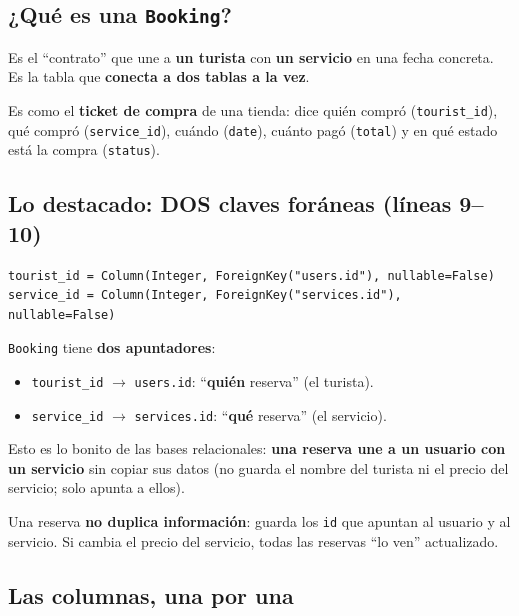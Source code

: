 \documentclass[11pt,a4paper]{article}
\begin{document}
\subsection{¿Qué es una \texttt{Booking}?}

Es el ``contrato'' que une a \textbf{un turista} con \textbf{un servicio} en una fecha concreta.
Es la tabla que \textbf{conecta a dos tablas a la vez}.

\begin{analogia}
Es como el \textbf{ticket de compra} de una tienda: dice quién compró (\texttt{tourist\_id}),
qué compró (\texttt{service\_id}), cuándo (\texttt{date}), cuánto pagó (\texttt{total})
y en qué estado está la compra (\texttt{status}).
\end{analogia}

\subsection{Lo destacado: DOS claves foráneas (líneas 9--10)}

\begin{lstlisting}
tourist_id = Column(Integer, ForeignKey("users.id"), nullable=False)
service_id = Column(Integer, ForeignKey("services.id"), nullable=False)
\end{lstlisting}

\texttt{Booking} tiene \textbf{dos apuntadores}:
\begin{itemize}
    \item \texttt{tourist\_id} $\rightarrow$ \texttt{users.id}: ``\textbf{quién} reserva'' (el turista).
    \item \texttt{service\_id} $\rightarrow$ \texttt{services.id}: ``\textbf{qué} reserva'' (el servicio).
\end{itemize}

Esto es lo bonito de las bases relacionales: \textbf{una reserva une a un usuario con un servicio}
sin copiar sus datos (no guarda el nombre del turista ni el precio del servicio; solo apunta a ellos).

\begin{recuadro}
Una reserva \textbf{no duplica información}: guarda los \texttt{id} que apuntan al usuario y al
servicio. Si cambia el precio del servicio, todas las reservas ``lo ven'' actualizado.
\end{recuadro}

\subsection{Las columnas, una por una}
\end{document}
